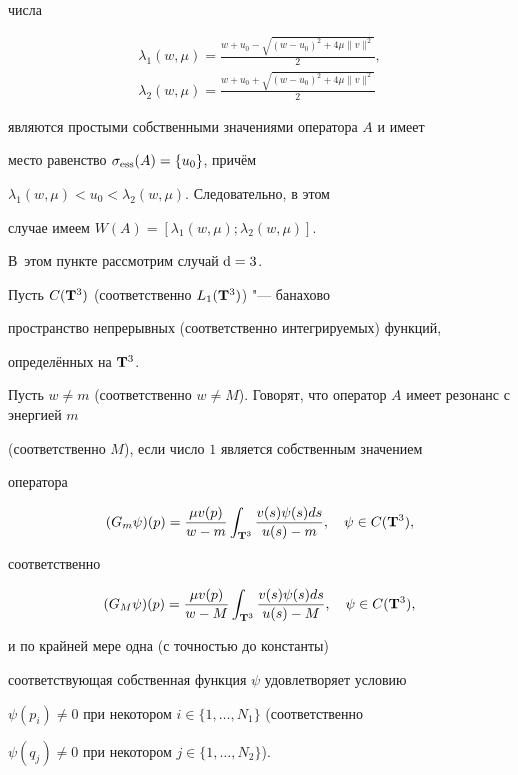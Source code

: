 числа

\begin{gather*}

\lambda_1(w, \mu)=\frac{w+u_0-\sqrt{(w-u_0)^2+4 \mu \|v\|^2}}{2},\\

\lambda_2(w, \mu)=\frac{w+u_0+\sqrt{(w-u_0)^2+4 \mu \|v\|^2}}{2}

\end{gather*}

являются простыми собственными значениями оператора $A$ и имеет

место равенство $\sigma_{\rm ess}(A)=\{u_0\}$, причём

$\lambda_1(w, \mu)<u_0<\lambda_2(w, \mu)$. Следовательно, в этом

случае имеем $W(A)=[\lambda_1(w, \mu); \lambda_2(w, \mu)]$.



\smallskip




В~этом пункте рассмотрим случай ${\rm d}=3$.



Пусть $C({\bf T}^3)$ (соответственно $L_1({\bf T}^3)$) "--- банахово

пространство непрерывных (соответственно интегрируемых) функций,

определённых на ${\bf T}^3$.



\smallskip



\hypertarget{RD:def1}{}

\begin{definition}[1]Пусть $w \neq m$ (соответственно $w \neq

M$). Говорят, что оператор $A$ имеет резонанс с энергией $m$

(соответственно $M$), если число $1$ является собственным значением

оператора

$$

(G_m \psi)(p)= \frac{\mu v(p)} {w-m} \int _{{\bf T}^3}

\frac{v(s)\psi(s)ds}{u(s)-m},\quad \psi \in C({\bf T}^3),

$$

соответственно

$$

(G_M \psi)(p)= \frac{\mu v(p)} {w-M} \int _{{\bf T}^3}

\frac{v(s)\psi(s)ds}{u(s)-M},\quad \psi \in C({\bf T}^3),

$$

и по крайней мере одна (с точностью до константы)

соответствующая собствен\-ная функция $\psi$ удовлетворяет условию

$\psi(p_i)\neq 0$ при некотором  \mbox{$i\in \{1, \ldots, N_1\}$} (соответственно

$\psi(q_j)\neq 0$ при некотором $j\in \{1, \ldots, N_2\}$).

\end{definition}



